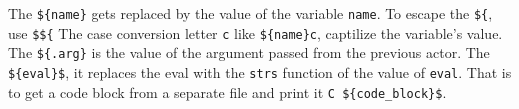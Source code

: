 The \texttt{\$\{name\}} gets replaced by the value of the variable
\texttt{name}. To escape the \texttt{\$\{}, use \texttt{\$\$\{} The case
conversion letter \texttt{c} like \texttt{\$\{name\}c}, captilize the
variable's value. The \texttt{\$\{.arg\}} is the value of the argument
passed from the previous actor. The \texttt{\$\{eval\}\$}, it replaces
the eval with the \texttt{strs} function of the value of \texttt{eval}.
That is to get a code block from a separate file and print it
\texttt{C\ \$\{code\_block\}\$}.
